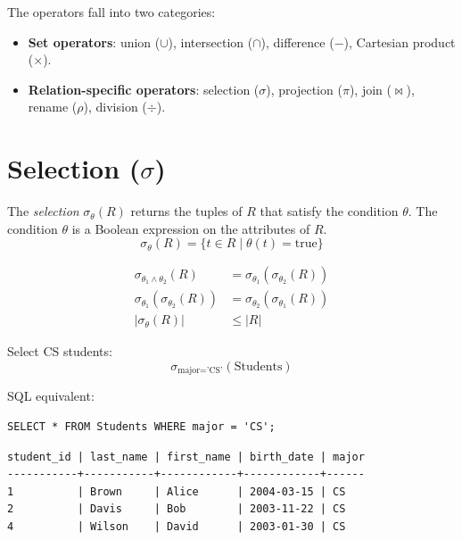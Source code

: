 The operators fall into two categories:
\begin{itemize}
    \item \textbf{Set operators}: union ($\cup$), intersection ($\cap$),
          difference ($-$), Cartesian product ($\times$).
    \item \textbf{Relation-specific operators}: selection ($\sigma$), projection ($\pi$),
          join ($\bowtie$), rename ($\rho$), division ($\div$).
\end{itemize}

\section{Selection ($\sigma$)}

\begin{definition}[Selection]
The \emph{selection} $\sigma_\theta(R)$ returns the tuples of $R$ that satisfy
the condition $\theta$. The condition $\theta$ is a Boolean expression
on the attributes of $R$.
\[
\sigma_\theta(R) = \{ t \in R \mid \theta(t) = \text{true} \}
\]
\end{definition}

\begin{keyformulas}[title=\textbf{Properties of Selection}]
\begin{align}
\sigma_{\theta_1 \land \theta_2}(R) &= \sigma_{\theta_1}(\sigma_{\theta_2}(R)) \tag{cascade}\\
\sigma_{\theta_1}(\sigma_{\theta_2}(R)) &= \sigma_{\theta_2}(\sigma_{\theta_1}(R)) \tag{commutativity}\\
|\sigma_\theta(R)| &\leq |R| \tag{cardinality}
\end{align}
\end{keyformulas}

\begin{example}
Select CS students:
\[
\sigma_{\text{major} = \text{'CS'}}(\text{Students})
\]

SQL equivalent:
\begin{codeblock}[title=\textbf{SQL Equivalent of Selection}]
\begin{verbatim}
SELECT * FROM Students WHERE major = 'CS';
\end{verbatim}
\end{codeblock}

\begin{codeoutput}
\begin{verbatim}
student_id | last_name | first_name | birth_date | major
-----------+-----------+------------+------------+------
1          | Brown     | Alice      | 2004-03-15 | CS
2          | Davis     | Bob        | 2003-11-22 | CS
4          | Wilson    | David      | 2003-01-30 | CS
\end{verbatim}
\end{codeoutput}
\end{example}

